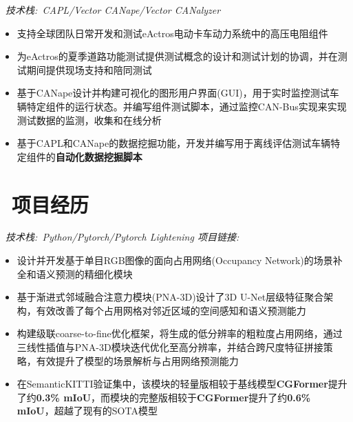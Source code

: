 \documentclass{resume}
\begin{document}
\ \textit{技术栈:\ CAPL/Vector CANape/Vector CANalyzer}
\begin{itemize}
  \item 支持全球团队日常开发和测试eActros电动卡车动力系统中的高压电阻组件
  \item 为eActros的夏季道路功能测试提供测试概念的设计和测试计划的协调，并在测试期间提供现场支持和陪同测试
  \item 基于CANape设计并构建可视化的图形用户界面(GUI)，用于实时监控测试车辆特定组件的运行状态。并编写组件测试脚本，通过监控CAN-Bus实现来实现测试数据的监测，收集和在线分析
  \item 基于CAPL和CANape的数据挖掘功能，开发并编写用于离线评估测试车辆特定组件的\textbf{自动化数据挖掘脚本}
\end{itemize}
\vspace{0.4cm}

\section{\faFolder\ 项目经历}
\ \textit{技术栈:\ Python/Pytorch/Pytorch Lightening \hfill 项目链接:\ }
\begin{itemize}
  \item 设计并开发基于单目RGB图像的面向占用网络(Occupancy Network)的场景补全和语义预测的精细化模块
  
  \item 基于渐进式邻域融合注意力模块(PNA-3D)设计了3D U-Net层级特征聚合架构，有效改善了每个占用网格对邻近区域的空间感知和语义预测能力

  \item 构建级联coarse-to-fine优化框架，将生成的低分辨率的粗粒度占用网络，通过三线性插值与PNA-3D模块迭代优化至高分辨率，并结合跨尺度特征拼接策略，有效提升了模型的场景解析与占用网络预测能力

  \item 在SemanticKITTI验证集中，该模块的轻量版相较于基线模型\textbf{CGFormer}提升了约\textbf{0.3\% mIoU}，而模块的完整版相较于\textbf{CGFormer}提升了约\textbf{0.6\% mIoU}，超越了现有的SOTA模型 
\end{itemize}
\end{document}
